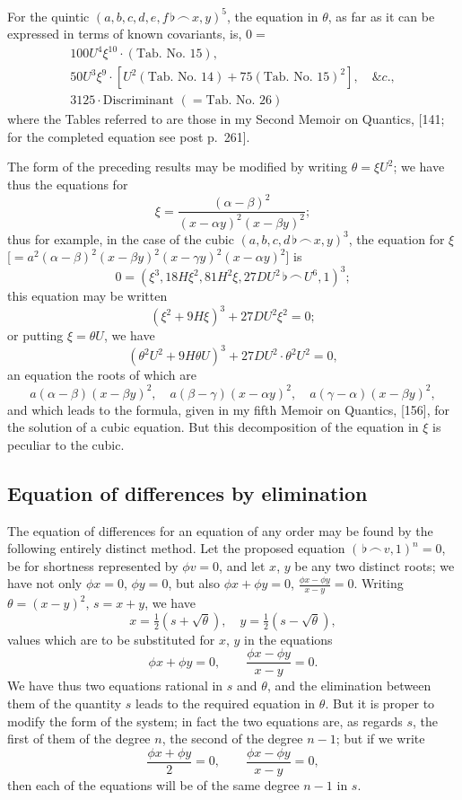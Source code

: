 \documentclass[11pt,a4paper]{book}
\begin{document}
For the quintic $(a,b,c,d,e,f\,\flat\,\frown\, x,y)^5$, the equation in $\theta$, as far as it can be expressed in terms of known covariants, is, $0=$
\begin{multline*}
100U^4\xi^{10}\cdot(\text{Tab.\ No.\ 15}),\\
50U^3\xi^9\cdot[U^2(\text{Tab.\ No.\ 14})+75(\text{Tab.\ No.\ 15})^2],\quad\&c.,\\
3125\cdot\text{Discriminant }(=\text{Tab.\ No.\ 26})
\end{multline*}
where the Tables referred to are those in my Second Memoir on Quantics, [141; for the completed equation see post p.~261].

The form of the preceding results may be modified by writing $\theta=\xi U^2$; we have thus the equations for
\[
\xi=\frac{(\alpha-\beta)^2}{(x-\alpha y)^2(x-\beta y)^2};
\]
thus for example, in the case of the cubic $(a,b,c,d\,\flat\,\frown\, x,y)^3$, the equation for $\xi$ [$=a^2(\alpha-\beta)^2(x-\beta y)^2(x-\gamma y)^2(x-\alpha y)^2$] is
\[
0=(\xi^3,18H\xi^2,81H^2\xi,27DU^2\,\flat\,\frown\, U^6,1)^3;
\]
this equation may be written
\[
(\xi^2+9H\xi)^3+27DU^2\xi^2=0;
\]
or putting $\xi=\theta U$, we have
\[
(\theta^2U^2+9H\theta U)^3+27DU^2\cdot\theta^2U^2=0,
\]
an equation the roots of which are
\[
a(\alpha-\beta)(x-\beta y)^2,\quad a(\beta-\gamma)(x-\alpha y)^2,\quad a(\gamma-\alpha)(x-\beta y)^2,
\]
and which leads to the formula, given in my fifth Memoir on Quantics, [156], for the solution of a cubic equation. But this decomposition of the equation in $\xi$ is peculiar to the cubic.

\subsection*{Equation of differences by elimination}

The equation of differences for an equation of any order may be found by the following entirely distinct method. Let the proposed equation $(\,\flat\,\frown\, v,1)^n=0$, be for shortness represented by $\phi v=0$, and let $x$, $y$ be any two distinct roots; we have not only $\phi x=0$, $\phi y=0$, but also $\phi x+\phi y=0$, $\frac{\phi x-\phi y}{x-y}=0$. Writing $\theta=(x-y)^2$, $s=x+y$, we have
\[
x=\tfrac{1}{2}(s+\sqrt{\theta}),\quad y=\tfrac{1}{2}(s-\sqrt{\theta}),
\]
values which are to be substituted for $x$, $y$ in the equations
\[
\phi x+\phi y=0,\qquad \frac{\phi x-\phi y}{x-y}=0.
\]
We have thus two equations rational in $s$ and $\theta$, and the elimination between them of the quantity $s$ leads to the required equation in $\theta$. But it is proper to modify the form of the system; in fact the two equations are, as regards $s$, the first of them of the degree $n$, the second of the degree $n-1$; but if we write
\[
\frac{\phi x+\phi y}{2}=0,\qquad \frac{\phi x-\phi y}{x-y}=0,
\]
then each of the equations will be of the same degree $n-1$ in $s$.
\end{document}
